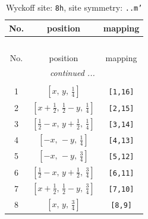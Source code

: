 \documentclass[fleqn,8pt]{jsarticle}
\begin{document}
\begin{longtable}{ccc}
\caption{Wyckoff site: {\tt 8h}, site symmetry: {\tt ..m'}}
 \\
 \hline \hline
No. & position & mapping \\ \hline \endfirsthead

\multicolumn{2}{l}{\tablename\ \thetable{}} \\
 \hline \hline
No. & position & mapping \\ \hline \endhead

 \hline \hline
\multicolumn{2}{r}{\footnotesize\it continued ...} \\ \endfoot

 \hline \hline
\multicolumn{2}{r}{} \\ \endlastfoot

1 & $\left[ x,\, y,\, \frac{1}{4} \right]$ & {\tt [1,16]} \\ \hline
2 & $\left[ x + \frac{1}{2},\, \frac{1}{2} - y,\, \frac{1}{4} \right]$ & {\tt [2,15]} \\ \hline
3 & $\left[ \frac{1}{2} - x,\, y + \frac{1}{2},\, \frac{1}{4} \right]$ & {\tt [3,14]} \\ \hline
4 & $\left[ - x,\, - y,\, \frac{1}{4} \right]$ & {\tt [4,13]} \\ \hline
5 & $\left[ - x,\, - y,\, \frac{3}{4} \right]$ & {\tt [5,12]} \\ \hline
6 & $\left[ \frac{1}{2} - x,\, y + \frac{1}{2},\, \frac{3}{4} \right]$ & {\tt [6,11]} \\ \hline
7 & $\left[ x + \frac{1}{2},\, \frac{1}{2} - y,\, \frac{3}{4} \right]$ & {\tt [7,10]} \\ \hline
8 & $\left[ x,\, y,\, \frac{3}{4} \right]$ & {\tt [8,9]} \\
\end{longtable}
\renewcommand{\arraystretch}{1.2}
\end{document}
